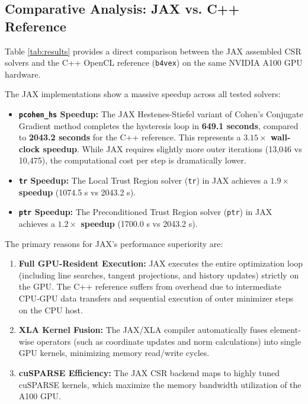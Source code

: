 \documentclass[11pt,a4paper]{article}
\begin{document}
\subsection{Comparative Analysis: JAX vs. C++ Reference}
Table \ref{tab:results} provides a direct comparison between the JAX assembled CSR solvers and the C++ OpenCL reference (\texttt{b4vex}) on the same NVIDIA A100 GPU hardware.

The JAX implementations show a massive speedup across all tested solvers:
\begin{itemize}
    \item \textbf{\texttt{pcohen\_hs} Speedup:} The JAX Hestenes-Stiefel variant of Cohen's Conjugate Gradient method completes the hysteresis loop in \textbf{649.1 seconds}, compared to \textbf{2043.2 seconds} for the C++ reference. This represents a \textbf{$3.15\times$ wall-clock speedup}. While JAX requires slightly more outer iterations (13,046 vs 10,475), the computational cost per step is dramatically lower.
    \item \textbf{\texttt{tr} Speedup:} The Local Trust Region solver (\texttt{tr}) in JAX achieves a \textbf{$1.9\times$ speedup} (1074.5 s vs 2043.2 s).
    \item \textbf{\texttt{ptr} Speedup:} The Preconditioned Trust Region solver (\texttt{ptr}) in JAX achieves a \textbf{$1.2\times$ speedup} (1700.0 s vs 2043.2 s).
\end{itemize}

The primary reasons for JAX's performance superiority are:
\begin{enumerate}
    \item \textbf{Full GPU-Resident Execution:} JAX executes the entire optimization loop (including line searches, tangent projections, and history updates) strictly on the GPU. The C++ reference suffers from overhead due to intermediate CPU-GPU data transfers and sequential execution of outer minimizer steps on the CPU host.
    \item \textbf{XLA Kernel Fusion:} The JAX/XLA compiler automatically fuses element-wise operators (such as coordinate updates and norm calculations) into single GPU kernels, minimizing memory read/write cycles.
    \item \textbf{cuSPARSE Efficiency:} The JAX CSR backend maps to highly tuned cuSPARSE kernels, which maximize the memory bandwidth utilization of the A100 GPU.
\end{enumerate}
\end{document}
